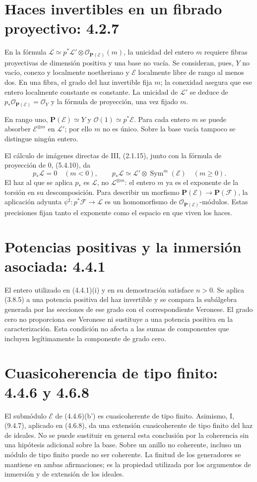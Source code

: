 \documentclass[11pt,a4paper]{article}
\begin{document}
\section{Haces invertibles en un fibrado proyectivo: 4.2.7}
En la fórmula
$\mathcal L\simeq p^*\mathcal L'\otimes\mathcal O_{\mathbf P(\mathcal E)}(m)$,
la unicidad del entero $m$ requiere fibras proyectivas de dimensión
positiva y una base no vacía. Se consideran, pues, $Y$ no vacío,
conexo y localmente noetheriano y $\mathcal E$ localmente libre de
rango al menos dos. En una fibra, el grado del haz invertible fija
$m$; la conexidad asegura que ese entero localmente constante es
constante. La unicidad de $\mathcal L'$ se deduce de
$p_*\mathcal O_{\mathbf P(\mathcal E)}=\mathcal O_Y$ y la fórmula
de proyección, una vez fijado $m$.

En rango uno, $\mathbf P(\mathcal E)\simeq Y$ y
$\mathcal O(1)\simeq p^*\mathcal E$. Para cada entero $m$ se puede
absorber $\mathcal E^{\otimes m}$ en $\mathcal L'$; por ello $m$
no es único. Sobre la base vacía tampoco se distingue ningún entero.

El cálculo de imágenes directas de III, (2.1.15), junto con la
fórmula de proyección de 0, (5.4.10), da
\[
p_*\mathcal L=0\quad(m<0),\qquad
p_*\mathcal L\simeq\mathcal L'\otimes
                \operatorname{Sym}^m(\mathcal E)\quad(m\geq0).
\]
El haz al que se aplica $p_*$ es $\mathcal L$, no
$\mathcal L^{\otimes m}$: el entero $m$ ya es el exponente de
la torsión en su descomposición. Para describir un morfismo
$\mathbf P(\mathcal E)\to\mathbf P(\mathcal F)$, la aplicación
adyunta $\psi^\sharp:p^*\mathcal F\to\mathcal L$ es un
homomorfismo de $\mathcal O_{\mathbf P(\mathcal E)}$-módulos.
Estas precisiones fijan tanto el exponente como el espacio en que
viven los haces.

\section{Potencias positivas y la inmersión asociada: 4.4.1}
El entero utilizado en (4.4.1)(i) y en su demostración satisface
$n>0$. Se aplica (3.8.5) a una potencia positiva del haz invertible
y se compara la subálgebra generada por las secciones de ese grado
con el correspondiente Veronese. El grado cero no proporciona ese
Veronese ni sustituye a una potencia positiva en la caracterización.
Esta condición no afecta a las sumas de componentes que incluyen
legítimamente la componente de grado cero.

\section{Cuasicoherencia de tipo finito: 4.4.6 y 4.6.8}
El submódulo $\mathcal E$ de (4.4.6)(b') es cuasicoherente de
tipo finito. Asimismo, I, (9.4.7), aplicado en (4.6.8), da una
extensión cuasicoherente de tipo finito del haz de ideales.
No se puede sustituir en general esta conclusión por la coherencia
sin una hipótesis adicional sobre la base. Sobre un anillo no
coherente, incluso un módulo de tipo finito puede no ser coherente.
La finitud de los generadores se mantiene en ambas afirmaciones;
es la propiedad utilizada por los argumentos de inmersión y de
extensión de los ideales.
\end{document}
